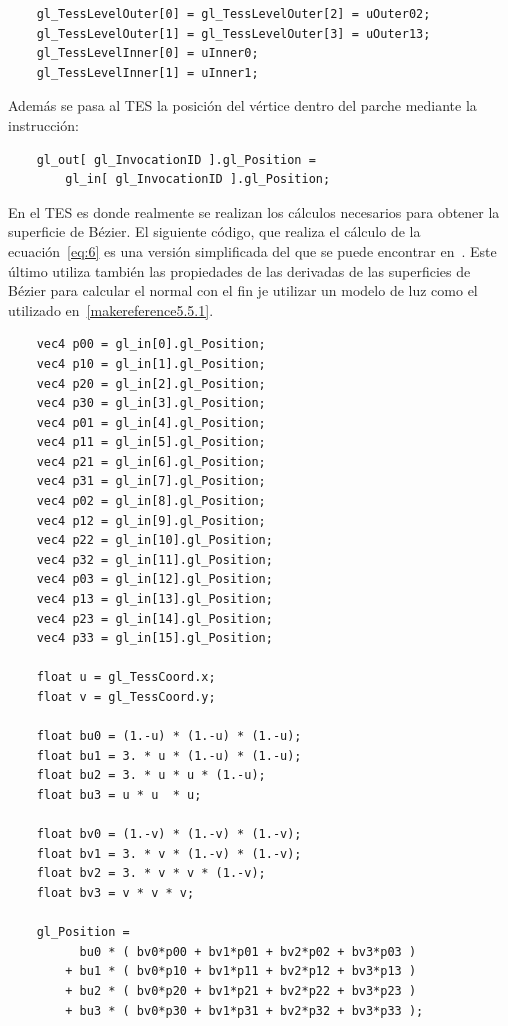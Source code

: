 \begin{verbatim}
    gl_TessLevelOuter[0] = gl_TessLevelOuter[2] = uOuter02;
    gl_TessLevelOuter[1] = gl_TessLevelOuter[3] = uOuter13;
    gl_TessLevelInner[0] = uInner0;
    gl_TessLevelInner[1] = uInner1;
\end{verbatim}

Además se pasa al TES la posición del vértice dentro del parche mediante la
instrucción:

\begin{verbatim}
    gl_out[ gl_InvocationID ].gl_Position =
        gl_in[ gl_InvocationID ].gl_Position;
\end{verbatim}

En el TES es donde realmente se realizan los cálculos necesarios para obtener la
superficie de Bézier. El siguiente código, que realiza el cálculo de la
ecuación~\eqref{eq:6} es una versión simplificada del que se puede encontrar
en~\citet{Bailey}. Este último utiliza también las propiedades de las derivadas
de las superficies de Bézier para calcular el normal con el fin je utilizar un
modelo de luz como el utilizado en~\ref{makereference5.5.1}.

\begin{verbatim}
    vec4 p00 = gl_in[0].gl_Position;
    vec4 p10 = gl_in[1].gl_Position;
    vec4 p20 = gl_in[2].gl_Position;
    vec4 p30 = gl_in[3].gl_Position;
    vec4 p01 = gl_in[4].gl_Position;
    vec4 p11 = gl_in[5].gl_Position;
    vec4 p21 = gl_in[6].gl_Position;
    vec4 p31 = gl_in[7].gl_Position;
    vec4 p02 = gl_in[8].gl_Position;
    vec4 p12 = gl_in[9].gl_Position;
    vec4 p22 = gl_in[10].gl_Position;
    vec4 p32 = gl_in[11].gl_Position;
    vec4 p03 = gl_in[12].gl_Position;
    vec4 p13 = gl_in[13].gl_Position;
    vec4 p23 = gl_in[14].gl_Position;
    vec4 p33 = gl_in[15].gl_Position;
    
    float u = gl_TessCoord.x;
    float v = gl_TessCoord.y;
    
    float bu0 = (1.-u) * (1.-u) * (1.-u);
    float bu1 = 3. * u * (1.-u) * (1.-u);
    float bu2 = 3. * u * u * (1.-u);
    float bu3 = u * u  * u;
    
    float bv0 = (1.-v) * (1.-v) * (1.-v);
    float bv1 = 3. * v * (1.-v) * (1.-v);
    float bv2 = 3. * v * v * (1.-v);
    float bv3 = v * v * v;
    
    gl_Position = 
          bu0 * ( bv0*p00 + bv1*p01 + bv2*p02 + bv3*p03 )
        + bu1 * ( bv0*p10 + bv1*p11 + bv2*p12 + bv3*p13 )
        + bu2 * ( bv0*p20 + bv1*p21 + bv2*p22 + bv3*p23 )
        + bu3 * ( bv0*p30 + bv1*p31 + bv2*p32 + bv3*p33 );

\end{verbatim}

